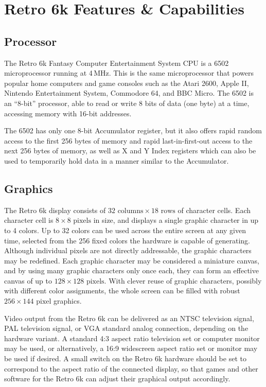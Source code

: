\documentclass[12pt]{{memoir}}
\begin{document}
\chapter{Retro 6k Features \& Capabilities}
\section{Processor}

The Retro 6k Fantasy Computer Entertainment System CPU is a 6502 microprocessor running at 4\,MHz. This is the same microprocessor that powers popular home computers and game consoles such as the Atari 2600, Apple II, Nintendo Entertainment System, Commodore 64, and BBC Micro. The 6502 is an ``8-bit'' processor, able to read or write 8 bits of data (one byte) at a time, accessing memory with 16-bit addresses.

The 6502 has only one 8-bit Accumulator register, but it also offers rapid random access to the first 256 bytes of memory and rapid last-in-first-out access to the next 256 bytes of memory, as well as X and Y Index registers which can also be used to temporarily hold data in a manner similar to the Accumulator.

\section{Graphics}

The Retro 6k display consists of $32 \textrm{ columns} \times 18 \textrm{ rows}$ of character cells. Each character cell is $8 \times 8 \textrm{ pixels}$ in size, and displays a single graphic character in up to 4 colors. Up to 32 colors can be used across the entire screen at any given time, selected from the 256 fixed colors the hardware is capable of generating. Although individual pixels are not directly addressable, the graphic characters may be redefined. Each graphic character may be considered a miniature canvas, and by using many graphic characters only once each, they can form an effective canvas of up to $128 \times 128 \textrm{ pixels}$. With clever reuse of graphic characters, possibly with different color assignments, the whole screen can be filled with robust $256 \times 144 \textrm{ pixel}$ graphics.

Video output from the Retro 6k can be delivered as an NTSC television signal, PAL television signal, or VGA standard analog connection, depending on the hardware variant. A standard 4:3 aspect ratio television set or computer monitor may be used, or alternatively, a 16:9 widescreen aspect ratio set or monitor may be used if desired. A small switch on the Retro 6k hardware should be set to correspond to the aspect ratio of the connected display, so that games and other software for the Retro 6k can adjust their graphical output accordingly.
\end{document}
